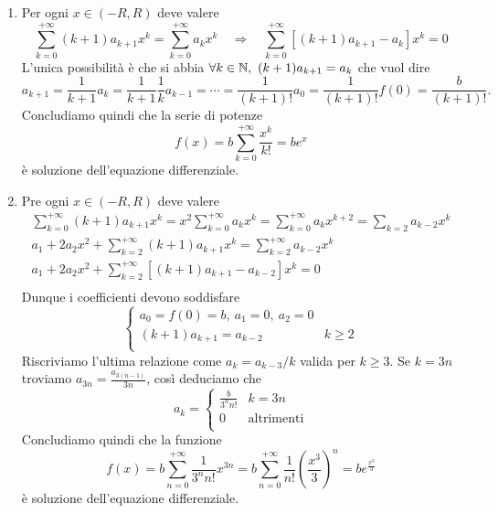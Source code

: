 \begin{enumerate}[label = (\roman*)]
\item Per ogni $ x \in (-R, R) $ deve valere
  \begin{equation*}
    \sum_{k = 0}^{+\infty} (k + 1) a_{k + 1} x^k = \sum_{k = 0}^{+\infty} a_k x^k \quad \Rightarrow \quad \sum_{k = 0}^{+\infty} [(k + 1) a_{k + 1} - a_k] x^{k} = 0
  \end{equation*}
  L'unica possibilità è che si abbia $ \forall k \in \mathbb{N}, \ (k + 1) a_{k + 1} = a_k $ che vuol dire \[a_{k + 1} = \frac{1}{k + 1} a_k = \frac{1}{k + 1} \frac{1}{k} a_{k  - 1} = \cdots = \frac{1}{(k + 1)!} a_0 = \frac{1}{(k + 1)!} f(0) = \frac{b}{(k + 1)!}.\] Concludiamo quindi che la serie di potenze \[f(x) = b \sum_{k = 0}^{+\infty} \frac{x^k}{k!} = b e^x\] è soluzione dell'equazione differenziale.
\item Pre ogni $ x \in (-R, R) $ deve valere
  \begin{gather*}
    \sum_{k = 0}^{+\infty} (k + 1) a_{k + 1} x^k = x^2 \sum_{k = 0}^{+\infty} a_k x^k = \sum_{k = 0}^{+\infty} a_k x^{k + 2} = \sum_{k = 2} a_{k - 2} x^k \\
    a_1  + 2 a_2 x^2 + \sum_{k = 2}^{+\infty} (k + 1) a_{k + 1} x^k = \sum_{k = 2}^{+\infty} a_{k - 2} x^k \\
    a_1  + 2 a_2 x^2 + \sum_{k = 2}^{+\infty} \left[(k + 1) a_{k + 1} - a_{k - 2}\right] x^k = 0 \\
  \end{gather*}
  Dunque i coefficienti devono soddisfare
  \begin{equation*}
    \begin{cases}
      a_0 = f(0) = b, \ a_1 = 0, \ a_2 = 0 \\
      (k + 1) a_{k + 1} = a_{k - 2} & k \geq 2 \\
    \end{cases}
  \end{equation*}
  Riscriviamo l'ultima relazione come $ a_k = a_{k - 3} / k $ valida per $ k \geq 3 $. Se $ k = 3n $ troviamo $ a_{3n} = \frac{a_{3(n - 1)}}{3n} $, così deduciamo che
  \begin{equation*}
    a_k =
    \begin{cases}
      \frac{b}{3^{n} n!} & k = 3n \\
      0 & \text{altrimenti} \\
    \end{cases}
  \end{equation*}
  Concludiamo quindi che la funzione \[f(x) = b \sum_{n = 0}^{+\infty}\frac{1}{3^n n!} x^{3n} = b \sum_{n = 0}^{+\infty}\frac{1}{n!} \left(\frac{x^3}{3}\right)^{n} = b e^{\frac{x^3}{3}}\] è soluzione dell'equazione differenziale.

\end{enumerate}
